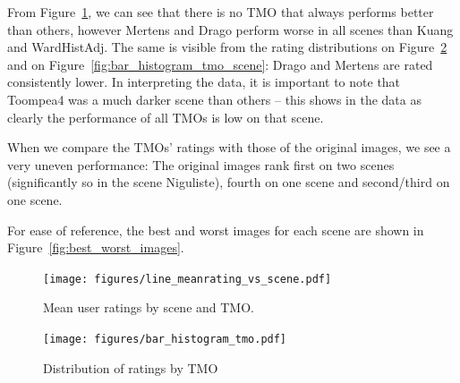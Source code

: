 \documentclass[a4paper]{scrartcl}
\begin{document}
From Figure~\ref{fig:line_meanrating_vs_scene}, we can see that there is no TMO that always performs better than others, however Mertens and Drago perform worse in all scenes than Kuang and WardHistAdj. The same is visible from the rating distributions on Figure~\ref{fig:bar_histogram_tmo} and on Figure~\ref{fig:bar_histogram_tmo_scene}: Drago and Mertens are rated consistently lower. In interpreting the data, it is important to note that Toompea4 was a much darker scene than others -- this shows in the data as clearly the performance of all TMOs is low on that scene.

When we compare the TMOs' ratings with those of the original images, we see a very uneven performance: The original images rank first on two scenes (significantly so in the scene Niguliste), fourth on one scene and second/third on one scene.

For ease of reference, the best and worst images for each scene are shown in Figure~\ref{fig:best_worst_images}.


\begin{figure}[h]
\centering
\texttt{[image: figures/line\_meanrating\_vs\_scene.pdf]}
\caption{Mean user ratings by scene and TMO.}
\label{fig:line_meanrating_vs_scene}
\end{figure}

\begin{figure}[h]
\centering
\texttt{[image: figures/bar\_histogram\_tmo.pdf]}
\caption{Distribution of ratings by TMO}
\label{fig:bar_histogram_tmo}
\end{figure}
\end{document}
